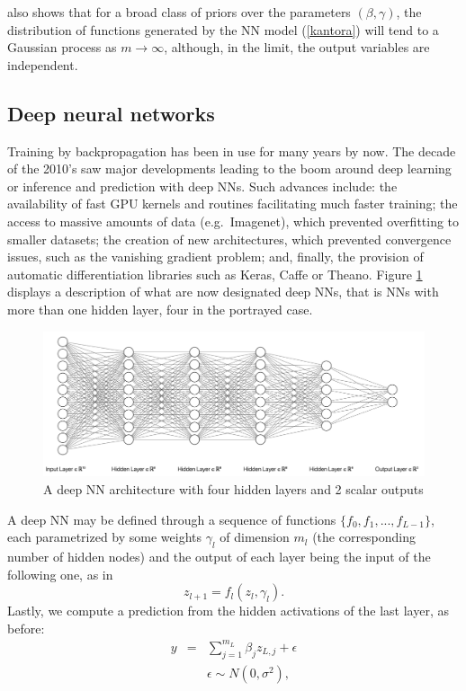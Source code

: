 \noindent
\cite{neal2012bayesian} also shows that
for a broad class of priors over the parameters 
$(\beta ,\gamma )$, the distribution of functions
generated by the NN model (\ref{kantora})
will tend to a Gaussian
process as  $m\rightarrow \infty$, although, in
the limit, the output variables are independent.

\subsection{Deep neural networks}

Training by backpropagation has been in use 
for many years by now.
The decade of the 2010's saw major developments
leading to 
the boom around deep learning \cite{deeplearningbook}
or inference and prediction with deep NNs. 
Such advances include:
the availability of fast GPU kernels and routines
facilitating much faster training;
the access to massive amounts of data (e.g.\ Imagenet), which prevented overfitting to smaller datasets; 
the creation of new architectures, which prevented  convergence issues, such as the vanishing gradient problem; 
and, finally, the provision of automatic differentiation libraries such as Keras, Caffe or Theano.
Figure \ref{figuradkk} displays a description
of what are now designated 
deep NNs, that is NNs with more than one hidden
layer, four in the portrayed case.
\begin{figure}
    \centering
    \includegraphics[scale=0.35]{figures/net2.png}
    \caption{A deep NN architecture with four hidden layers and 2 scalar outputs}
    \label{figuradkk}
\end{figure}


A deep NN may be defined through   
a sequence of functions $\lbrace f_0, f_1, ..., f_{L-1} \rbrace$, each parametrized by some weights $\gamma_l$
of dimension $m_l$  (the corresponding number of hidden nodes) and the output of each layer being the input of the following one, as in
$$
    z_{l+1} = f_l ( z_l, \gamma_l).
$$
Lastly, we compute a prediction from the hidden activations of the last layer, as before:
\begin{eqnarray}
y         & = & \sum_{j=1}^{m_L} \beta_j z_{L,j} +
                    \epsilon %
                    \nonumber\\
              & & \epsilon \sim N(0,\sigma^2),
                  \nonumber \\
\end{eqnarray}

